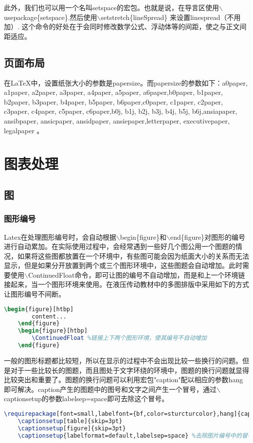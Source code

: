 \documentclass[cn,10pt,math=newtx,citestyle=gb7714-2015,bibstyle=gb7714-2015]{elegantbook}
\begin{document}
此外，我们也可以用一个名叫setspace的宏包。也就是说，在导言区使用$\backslash$usepackage\{setspace\}.然后使用$\backslash$setstretch\{lineSpread\} 来设置linespread（不用加\selectfont）. 这个命令的好处在于会同时修改数学公式、浮动体等的间距，使之与正文间距适应。

\section{页面布局}

在\LaTeX{}中，设置纸张大小的参数是papersize。而papersize的参数如下：a0paper, a1paper, a2paper, a3paper, a4paper, a5paper, a6paper,b0paper, b1paper, b2paper, b3paper, b4paper, b5paper, b6paper,c0paper, c1paper, c2paper, c3paper, c4paper, c5paper, c6paper,b0j, b1j, b2j, b3j, b4j, b5j, b6j,ansiapaper, ansibpaper, ansicpaper, ansidpaper, ansiepaper,letterpaper, executivepaper, legalpaper 。

\chapter{图表处理}

\section{图}

\subsection{图形编号}

Latex在处理图形编号时，会自动根据$\backslash$begin\{figure\}和$\backslash$end\{figure\}对图形的编号进行自动累加。在实际使用过程中，会经常遇到一些好几个图公用一个图题的情况，如果将这些图都放置在一个环境中，有些图可能会因为纸面大小的关系而无法显示，但是如果分开放置到两个或三个图形环境中，这些图题会自动增加。此时需要使用$\backslash$ContinuedFloat命令，即可让图的编号不自动增加，而是和上一个环境链接起来，当一个图形环境来使用。在液压传动教材中的多图排版中采用如下的方式让图形编号不间断。
\begin{lstlisting}[language=tex]
	\begin{figure}[htbp]
		content...
	\end{figure}	
	\begin{figure}[htbp]
		\ContinuedFloat %链接上下两个图形环境，使其编号不自动增加
	\end{figure}
\end{lstlisting}

一般的图形标题都比较短，所以在显示的过程中不会出现比较一些换行的问题。但是对于一些比较长的图题，而且图处于文字环绕的环境中，图题的换行问题就显得比较突出和重要了。图题的换行问题可以利用宏包"caption"配以相应的参数hang即可解决。caption产生的图题中的图号和文字之间产生一个冒号，通过$\backslash$captionsetup的参数labelsep=space即可去除这个冒号。
\begin{lstlisting}[language=tex]
	\requirepackage[font=small,labelfont={bf,color=sturcturcolor},hang]{caption} %hang解决了图题过长时的自动换行问题
	\captionsetup[table]{skip=3pt}
	\captionsetup[figure]{skip=3pt}
	\captionsetup{labelformat=default,labelsep=space} %去除图片编号中的冒号
\end{lstlisting}
\end{document}
